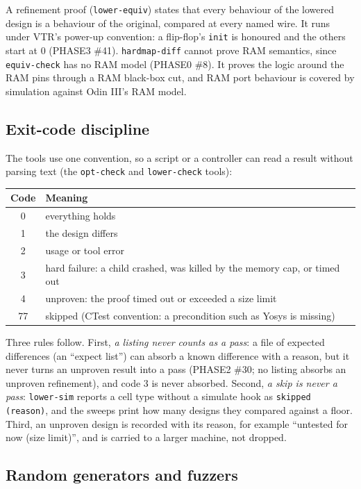 \documentclass[conference]{IEEEtran}
\newcommand{\code}[1]{\texttt{#1}}
\begin{document}
A refinement proof (\code{lower-equiv}) states that every behaviour of the lowered design is a
behaviour of the original, compared at every named wire. It runs under VTR's power-up convention:
a flip-flop's \code{init} is honoured and the others start at 0 (PHASE3 \#41).
\code{hardmap-diff} cannot prove RAM semantics, since \code{equiv-check} has no RAM model
(PHASE0 \#8). It proves the logic around the RAM pins through a RAM black-box cut, and RAM port
behaviour is covered by simulation against Odin III's RAM model.

\subsection{Exit-code discipline}
\label{sec:exitcodes}

The tools use one convention, so a script or a controller can read a result without parsing text
(the \code{opt-check} and \code{lower-check} tools):
\begin{center}
\footnotesize
\begin{tabular}{@{}cp{}@{}}
\toprule
Code & Meaning \\
\midrule
0 & everything holds \\
1 & the design differs \\
2 & usage or tool error \\
3 & hard failure: a child crashed, was killed by the memory cap, or timed out \\
4 & unproven: the proof timed out or exceeded a size limit \\
77 & skipped (CTest convention: a precondition such as Yosys is missing) \\
\bottomrule
\end{tabular}
\end{center}
Three rules follow. First, \emph{a listing never counts as a pass}: a file of expected
differences (an ``expect list'') can absorb a known difference with a reason, but it never turns
an unproven result into a pass (PHASE2 \#30; no listing absorbs an unproven refinement), and code 3 is never absorbed. Second, \emph{a skip
is never a pass}: \code{lower-sim} reports a cell type without a simulate hook as
\code{skipped (reason)}, and the sweeps print how many designs they compared against a floor.
Third, an unproven design is recorded with its reason, for example ``untested for now (size
limit)'', and is carried to a larger machine, not dropped.

\subsection{Random generators and fuzzers}
\label{sec:fuzz}
\end{document}
